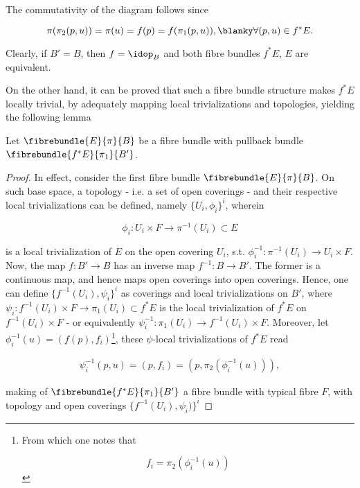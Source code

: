 The commutativity of the diagram follows since 

$$
    \pi( \pi_2(p, u)) = \pi (u) = f(p) = f(\pi_1(p,u)), \blanky \forall (p,u) \in f^{*}E.
$$

Clearly, if $B' = B$, then $f = \idop_{B}$ and both fibre bundles $f^{*}E$, $E$ are equivalent. \medbreak

On the other hand, it can be proved that such a fibre bundle structure makes $f^{*}E$ locally trivial, by adequately mapping local trivializations and topologies, yielding the following lemma 

\begin{theo}
    Let $\fibrebundle{E}{\pi}{B}$ be a fibre bundle with pullback bundle $\fibrebundle{f^{*}E}{\pi_1}{B'}$.
\end{theo}

\begin{proof}

In effect, consider the first fibre bundle $\fibrebundle{E}{\pi}{B}$. 
On such base space, a topology - i.e. a set of open coverings - and their respective local trivializations can be defined, namely $\{U_i, \phi_i\}^{i}$, wherein 

\[
    \phi_i : U_i \times F \rightarrow \pi^{-1}(U_i) \subset E
\]

is a local trivialization of $E$ on the open covering $U_i$, s.t. $\phi_i^{-1}: \pi^{-1}(U_i) \rightarrow U_i \times F$. 
Now, the map $f: B' \rightarrow B$ has an inverse map $f^{-1} : B \rightarrow B'$. 
The former is a continuous map, and hence maps open coverings into open coverings. 
Hence, one can define $\{f^{-1}(U_i), \psi_i\}^{i}$ as coverings and local trivializations on $B'$, where $\psi_i : f^{-1}(U_i) \times F \rightarrow \pi_1(U_i) \subset f^{*}E$ is the local trivialization of $f^{*}E$ on $f^{-1}(U_i) \times F$ - or equivalently $\psi_i^{-1} : \pi_1(U_i) \rightarrow f^{-1}(U_i) \times F$. 
Moreover, let $\phi_i^{-1}(u) = (f(p), f_i)$\footnote{From which one notes that 

$$
    f_i = \pi_2 (\phi_i^{-1}(u))
$$

}, these $\psi$-local trivializations of $f^{*}E$ read 

\[
    \begin{array}{cc}
        \psi_i^{-1}(p,u) = (p, f_i) = (p, \pi_2 ( \phi_i^{-1} (u))),
    \end{array}
\]

making of $\fibrebundle{f^{*}E}{\pi_1}{B'}$ a fibre bundle with typical fibre $F$, with topology and open coverings $\{f^{-1}(U_i), \psi_i)\}^{i}$
\end{proof}

